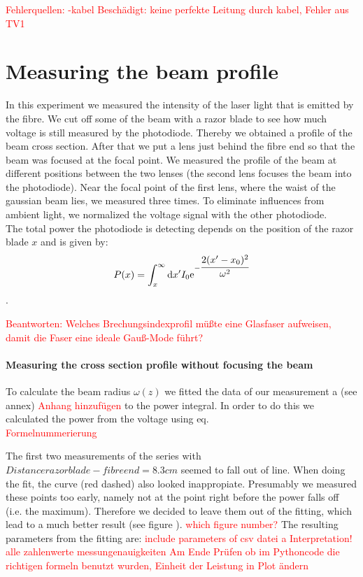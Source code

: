 \documentclass{article}
\begin{document}
\textcolor{red}{Fehlerquellen:
-kabel Beschädigt: keine perfekte Leitung durch kabel, Fehler aus TV1}

\section{Measuring the beam profile}

In this experiment we measured the intensity of the laser light that is emitted by the fibre. We cut off some of the beam with a razor blade to see how much voltage is still measured by the photodiode. Thereby we obtained a profile of the beam cross section. After that we put a lens just behind the fibre end so that the beam was focused at the focal point. We measured the profile of the beam at different positions between the two lenses (the second lens focuses the beam into the photodiode). Near the focal point of the first lens, where the waist of the gaussian beam lies, we measured three times. To eliminate influences from ambient light, we normalized the voltage signal with the other photodiode.\\

The total power the photodiode is detecting depends on the position of the razor blade $x$ and is given by:
\[ P(x) = \int_x^\infty\mathrm{d}x' I_0 \mathrm{e}^{-\cfrac{2(x'-x_0)^2}{\omega^2}} \].

\textcolor{red}{Beantworten: Welches Brechungsindexprofil müßte eine Glasfaser aufweisen, damit die Faser eine ideale Gauß-Mode führt?}

\paragraph{Measuring the cross section profile without focusing the beam}

To calculate the beam radius $\omega (z)$ we fitted the data of our measurement a (see annex)
\textcolor{red}{Anhang hinzufügen} %
to the power integral. In order to do this we calculated the power from the voltage using eq. \\
\textcolor{red}{Formelnummerierung}

The first two measurements of the series with $Distance razor blade - fibre end = 8.3 cm$ seemed to fall out of line. When doing the fit, the curve (red dashed) also looked inappropiate. Presumably we measured these points too early, namely not at the point right before the power falls off (i.e. the maximum). Therefore we decided to leave them out of the fitting, which lead to a much better result (see figure ).
\textcolor{red}{which figure number?}
The resulting parameters from the fitting are:
\textcolor{red}{
include parameters of csv datei a
Interpretation!
alle zahlenwerte
messungenauigkeiten
Am Ende Prüfen ob im Pythoncode die richtigen formeln benutzt wurden, Einheit der Leistung in Plot ändern}
\end{document}
